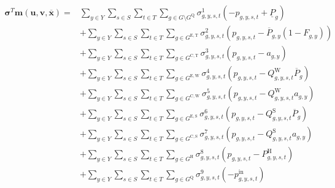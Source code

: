 \documentclass{article}
\newcommand{\sGenerators}{G}
\newcommand{\sGeneratorsExistingThermal}{G^{\mathrm{E,T}}}
\newcommand{\sGeneratorsExistingWind}{G^{\mathrm{E,W}}}
\newcommand{\sGeneratorsExistingSolar}{G^{\mathrm{E,S}}}
\newcommand{\sGeneratorsCandidateThermal}{G^{\mathrm{C,T}}}
\newcommand{\sGeneratorsCandidateWind}{G^{\mathrm{C,W}}}
\newcommand{\sGeneratorsCandidateSolar}{G^{\mathrm{C,S}}}
\newcommand{\sGeneratorsHydro}{G^{\mathrm{H}}}
\newcommand{\sStorage}{G^{\mathrm{Q}}}
\newcommand{\sYears}{Y}
\newcommand{\sScenarios}{S}
\newcommand{\sIntervals}{T}
\newcommand{\iGenerator}{g}
\newcommand{\iYear}{y}
\newcommand{\iScenario}{s}
\newcommand{\iInterval}{t}
\newcommand{\cPowerOutputMax}[1][\iGenerator,\iYear]{\overline{P}_{#1}}
\newcommand{\cPowerOutputMin}[1][\iGenerator]{\underline{P}_{#1}}
\newcommand{\cCapacityFactorWind}[1][\iGenerator,\iYear,\iScenario,\iInterval]{Q_{#1}^{\mathrm{W}}}
\newcommand{\cCapacityFactorSolar}[1][\iGenerator,\iYear,\iScenario,\iInterval]{Q_{#1}^{\mathrm{S}}}
\newcommand{\cRetirementIndicator}[1][\iGenerator,\iYear]{F_{#1}}
\newcommand{\cPowerOutputHydro}[1][\iGenerator,\iYear,\iScenario,\iInterval]{P^{\mathrm{H}}_{#1}}
\newcommand{\vPower}[1][\iGenerator,\iYear,\iScenario,\iInterval]{p_{#1}}
\newcommand{\vPowerIn}[1][\iGenerator,\iYear,\iScenario,\iInterval]{p^{\mathrm{in}}_{#1}}
\newcommand{\vInstalledCapacityTotal}[1][\iGenerator,\iYear]{a_{#1}}
\newcommand{\dMinPowerOutput}[1][\iGenerator,\iYear,\iScenario,\iInterval]{\sigma_{#1}^{1}}
\newcommand{\dMaxPowerOutputExistingThermal}[1][\iGenerator,\iYear,\iScenario,\iInterval]{\sigma_{#1}^{2}}
\newcommand{\dMaxPowerOutputCandidateThermal}[1][\iGenerator,\iYear,\iScenario,\iInterval]{\sigma_{#1}^{3}}
\newcommand{\dMaxPowerOutputWindExisting}[1][\iGenerator,\iYear,\iScenario,\iInterval]{\sigma_{#1}^{4}}
\newcommand{\dMaxPowerOutputWindCandidate}[1][\iGenerator,\iYear,\iScenario,\iInterval]{\sigma_{#1}^{5}}
\newcommand{\dMaxPowerOutputSolarExisting}[1][\iGenerator,\iYear,\iScenario,\iInterval]{\sigma_{#1}^{6}}
\newcommand{\dMaxPowerOutputSolarCandidate}[1][\iGenerator,\iYear,\iScenario,\iInterval]{\sigma_{#1}^{7}}
\newcommand{\dMaxPowerOutputHydro}[1][\iGenerator,\iYear,\iScenario,\iInterval]{\sigma_{#1}^{8}}
\newcommand{\dNonNegativeCharging}[1][\iGenerator,\iYear,\iScenario,\iInterval]{\sigma_{#1}^{9}}
\begin{document}
\begin{align}
		\bm{\sigma}^{T}\bm{m}(\bm{u}, \bm{v}, \bm{\overline{x}}) = & \sum\limits_{\iYear \in \sYears}\sum\limits_{\iScenario \in \sScenarios}\sum\limits_{\iInterval \in \sIntervals} \sum\limits_{\iGenerator \in \sGenerators \setminus \sStorage} \dMinPowerOutput \left(-\vPower + \cPowerOutputMin\right)\\
		& + \sum\limits_{\iYear \in \sYears}\sum\limits_{\iScenario \in \sScenarios}\sum\limits_{\iInterval \in \sIntervals} \sum\limits_{\iGenerator \in \sGeneratorsExistingThermal} \dMaxPowerOutputExistingThermal \left(\vPower - \cPowerOutputMax \left(1 - \cRetirementIndicator\right)\right)\\
		& + \sum\limits_{\iYear \in \sYears}\sum\limits_{\iScenario \in \sScenarios}\sum\limits_{\iInterval \in \sIntervals} \sum\limits_{\iGenerator \in \sGeneratorsCandidateThermal} \dMaxPowerOutputCandidateThermal \left(\vPower - \vInstalledCapacityTotal\right)\\
		& + \sum\limits_{\iYear \in \sYears}\sum\limits_{\iScenario \in \sScenarios}\sum\limits_{\iInterval \in \sIntervals} \sum\limits_{\iGenerator \in \sGeneratorsExistingWind} \dMaxPowerOutputWindExisting \left(\vPower - \cCapacityFactorWind \cPowerOutputMax[\iGenerator] \right)\\
		& + \sum\limits_{\iYear \in \sYears}\sum\limits_{\iScenario \in \sScenarios}\sum\limits_{\iInterval \in \sIntervals} \sum\limits_{\iGenerator \in \sGeneratorsCandidateWind} \dMaxPowerOutputWindCandidate \left(\vPower - \cCapacityFactorWind \vInstalledCapacityTotal\right)\\
		& + \sum\limits_{\iYear \in \sYears}\sum\limits_{\iScenario \in \sScenarios}\sum\limits_{\iInterval \in \sIntervals} \sum\limits_{\iGenerator \in \sGeneratorsExistingSolar} \dMaxPowerOutputSolarExisting \left(\vPower - \cCapacityFactorSolar \cPowerOutputMax[\iGenerator]\right)\\
		& + \sum\limits_{\iYear \in \sYears}\sum\limits_{\iScenario \in \sScenarios}\sum\limits_{\iInterval \in \sIntervals} \sum\limits_{\iGenerator \in \sGeneratorsCandidateSolar} \dMaxPowerOutputSolarCandidate \left(\vPower - \cCapacityFactorSolar \vInstalledCapacityTotal\right)\\
		& + \sum\limits_{\iYear \in \sYears}\sum\limits_{\iScenario \in \sScenarios}\sum\limits_{\iInterval \in \sIntervals} \sum\limits_{\iGenerator \in \sGeneratorsHydro} \dMaxPowerOutputHydro \left(\vPower - \cPowerOutputHydro\right)\\
		& + \sum\limits_{\iYear \in \sYears}\sum\limits_{\iScenario \in \sScenarios}\sum\limits_{\iInterval \in \sIntervals} \sum\limits_{\iGenerator \in \sStorage} \dNonNegativeCharging \left(-\vPowerIn\right)\\

\end{align}
\end{document}
